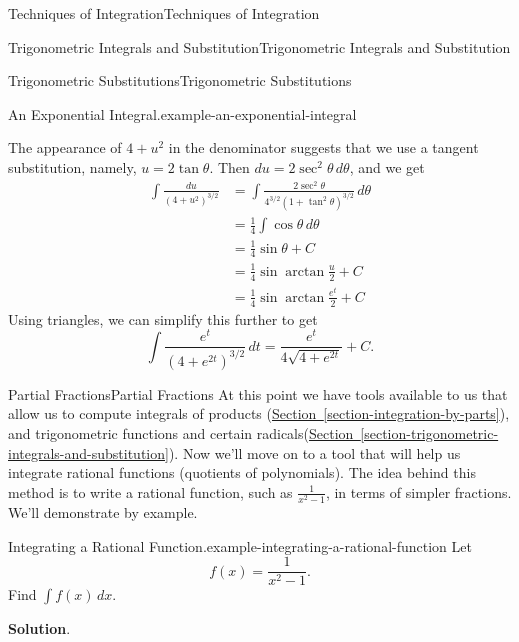 \documentclass[10pt,]{book}
\numberwithin{equation}{section}
\begin{document}
\begin{chapterptx}{Techniques of Integration}{}{Techniques of Integration}{}{}
\begin{sectionptx}{Trigonometric Integrals and Substitution}{}{Trigonometric Integrals and Substitution}{}{}
\begin{subsectionptx}{Trigonometric Substitutions}{}{Trigonometric Substitutions}{}{}
\begin{example}{An Exponential Integral.}{example-an-exponential-integral}
\begin{equation*}
\end{equation*}
%
\par
\hypertarget{p-548}{}%
The appearance of \(4 + u^{2}\) in the denominator suggests that we use a tangent substitution, namely, \(u = 2\tan\theta\). Then \(du = 2\sec^{2}\theta\,d\theta\), and we get%
\begin{align*}
\int\frac{du}{(4 + u^{2})^{3/2}} & = \int\frac{2\sec^{2}\theta}{4^{3/2}(1 + \tan^{2}\theta)^{3/2}}\,d\theta \\
& = \frac{1}{4}\int\cos\theta\,d\theta \\
& = \frac{1}{4}\sin\theta + C \\
& = \frac{1}{4}\sin\arctan\frac{u}{2} + C \\
& = \frac{1}{4}\sin\arctan\frac{e^{t}}{2} + C 
\end{align*}
Using triangles, we can simplify this further to get%
\begin{equation*}
\int\frac{e^{t}}{(4 + e^{2t})^{3/2}}\,dt = \frac{e^{t}}{4\sqrt{4 + e^{2t}}} + C.
\end{equation*}
%
\end{example}
\end{subsectionptx}
\end{sectionptx}
%
%
\typeout{************************************************}
\typeout{************************************************}
%
\begin{sectionptx}{Partial Fractions}{}{Partial Fractions}{}{}\label{section-partial-fractions}
\hypertarget{p-549}{}%
At this point we have tools available to us that allow us to compute integrals of products (\hyperref[section-integration-by-parts]{Section~\ref{section-integration-by-parts}}), and trigonometric functions and certain radicals(\hyperref[section-trigonometric-integrals-and-substitution]{Section~\ref{section-trigonometric-integrals-and-substitution}}). Now we'll move on to a tool that will help us integrate rational functions (quotients of polynomials). The idea behind this method is to write a rational function, such as \(\frac{1}{x^{2} - 1}\), in terms of simpler fractions. We'll demonstrate by example.%
\begin{example}{Integrating a Rational Function.}{example-integrating-a-rational-function}%
\hypertarget{p-550}{}%
Let%
\begin{equation*}
f(x) = \frac{1}{x^{2} - 1}.
\end{equation*}
Find \(\int f(x)\,dx\).%
\par\smallskip%
\noindent\textbf{Solution}.\hypertarget{solution-121}{}\quad%

\end{example}
\end{sectionptx}
\end{chapterptx}
\end{document}
